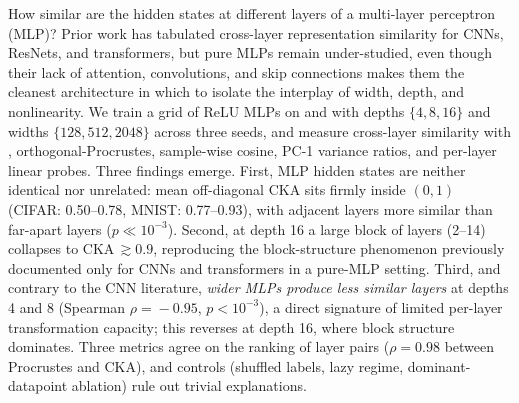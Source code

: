 How similar are the hidden states at different layers of a multi-layer perceptron (MLP)? Prior work has tabulated cross-layer representation similarity for CNNs, ResNets, and transformers, but pure MLPs remain under-studied, even though their lack of attention, convolutions, and skip connections makes them the cleanest architecture in which to isolate the interplay of width, depth, and nonlinearity. We train a grid of ReLU MLPs on \cifar and \mnist with depths $\{4, 8, 16\}$ and widths $\{128, 512, 2048\}$ across three seeds, and measure cross-layer similarity with \ckam, orthogonal-Procrustes, sample-wise cosine, PC-1 variance ratios, and per-layer linear probes. Three findings emerge. First, MLP hidden states are neither identical nor unrelated: mean off-diagonal CKA sits firmly inside $(0,1)$ (CIFAR: 0.50--0.78, MNIST: 0.77--0.93), with adjacent layers more similar than far-apart layers ($p\!\ll\!10^{-3}$). Second, at depth 16 a large block of layers (2--14) collapses to CKA\,$\gtrsim\!0.9$, reproducing the block-structure phenomenon previously documented only for CNNs and transformers in a pure-MLP setting. Third, and contrary to the CNN literature, \emph{wider MLPs produce less similar layers} at depths 4 and 8 (Spearman $\rho\!=\!-0.95$, $p\!<\!10^{-3}$), a direct signature of limited per-layer transformation capacity; this reverses at depth 16, where block structure dominates. Three metrics agree on the ranking of layer pairs ($\rho\!=\!0.98$ between Procrustes and CKA), and controls (shuffled labels, lazy regime, dominant-datapoint ablation) rule out trivial explanations.
